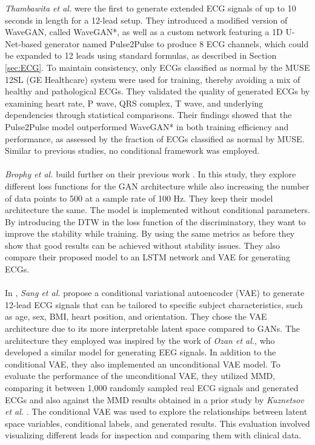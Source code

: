 \textit{Thambawita et al.} \cite{thambawita_deepfake_2021} were the first to generate extended ECG signals of up to 10 seconds in length for a 12-lead setup. They introduced a modified version of WaveGAN, called WaveGAN*, as well as a custom network featuring a 1D U-Net-based generator named Pulse2Pulse to produce 8 ECG channels, which could be expanded to 12 leads using standard formulas, as described in Section \ref{sec:ECG}. To maintain consistency, only ECGs classified as normal by the MUSE 12SL (GE Healthcare) system were used for training, thereby avoiding a mix of healthy and pathological ECGs. They validated the quality of generated ECGs by examining heart rate, P wave, QRS complex, T wave, and underlying dependencies through statistical comparisons. Their findings showed that the Pulse2Pulse model outperformed WaveGAN* in both training efficiency and performance, as assessed by the fraction of ECGs classified as normal by MUSE. Similar to previous studies, no conditional framework was employed.
\\ \\
\textit{Brophy et al.} \cite{brophy_multivariate_2021} build further on their previous work \cite{brophy_synthesis_2020}. In this study, they explore different loss functions for the GAN architecture while also increasing the number of data points to 500 at a sample rate of 100 Hz. They keep their model architecture the same. The model is implemented without conditional parameters. By introducing the DTW in the loss function of the discriminatory, they want to improve the stability while training. By using the same metrics as before they show that good results can be achieved without stability issues. They also compare their proposed model to an LSTM network and VAE for generating ECGs. 
\\ \\
In \cite{sang_generation_2022}, \textit{Sang et al.} propose a conditional variational autoencoder (VAE) to generate 12-lead ECG signals that can be tailored to specific subject characteristics, such as age, sex, BMI, heart position, and orientation. They chose the VAE architecture due to its more interpretable latent space compared to GANs. The architecture they employed was inspired by the work of \textit{Ozan et al.}, who developed a similar model for generating EEG signals. In addition to the conditional VAE, they also implemented an unconditional VAE model. To evaluate the performance of the unconditional VAE, they utilized MMD, comparing it between 1,000 randomly sampled real ECG signals and generated ECGs and also against the MMD results obtained in a prior study by \textit{Kuznetsov et al.} \cite{kuznetsov_electrocardiogram_2020}. The conditional VAE was used to explore the relationships between latent space variables, conditional labels, and generated results. This evaluation involved visualizing different leads for inspection and comparing them with clinical data.
